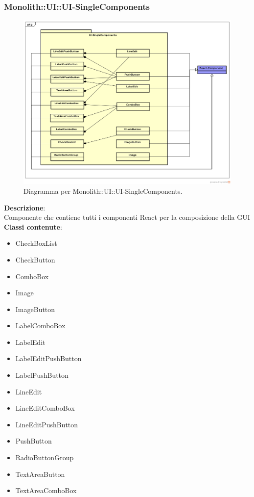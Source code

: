 \subsubsection{Monolith::UI::UI-SingleComponents}
   \FloatBarrier
   \begin{figure}[ht]
   \centering
\includegraphics[width=\textwidth,keepaspectratio]{img/UI-SingleComponents}
   \caption{Diagramma per Monolith::UI::UI-SingleComponents.}
\end{figure}
\FloatBarrier
\textbf{Descrizione}:\\
 Componente che contiene tutti i componenti React per la composizione della GUI 
\\ \textbf{Classi contenute}:\\
\begin{itemize}
\item CheckBoxList
\item CheckButton
\item ComboBox
\item Image
\item ImageButton
\item LabelComboBox
\item LabelEdit
\item LabelEditPushButton
\item LabelPushButton
\item LineEdit
\item LineEditComboBox
\item LineEditPushButton
\item PushButton
\item RadioButtonGroup
\item TextAreaButton
\item TextAreaComboBox
\end{itemize}


